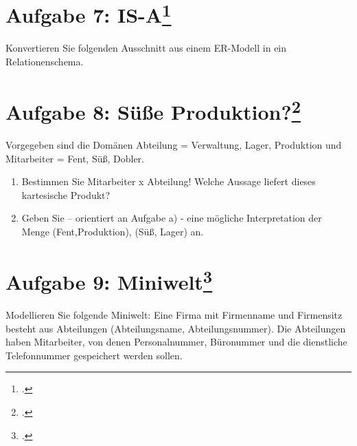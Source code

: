 \documentclass{lehramt-informatik}
\begin{document}
%

\section{Aufgabe 7: IS-A\footcite{db:ab:7}}

Konvertieren Sie folgenden Ausschnitt aus einem ER-Modell in ein Relationenschema.

%

\section{Aufgabe 8: Süße Produktion?\footcite{db:ab:7}}

Vorgegeben sind die Domänen Abteilung = Verwaltung, Lager, Produktion
und Mitarbeiter = Fent, Süß, Dobler.

\begin{enumerate}


\item Bestimmen Sie Mitarbeiter x Abteilung! Welche Aussage liefert
dieses kartesische Produkt?


\item Geben Sie – orientiert an Aufgabe a) - eine mögliche
Interpretation der Menge (Fent,Produktion), (Süß, Lager) an.

\end{enumerate}

%

\section{Aufgabe 9: Miniwelt\footcite{db:ab:7}}

Modellieren Sie folgende Miniwelt: Eine Firma mit Firmenname und
Firmensitz besteht aus Abteilungen (Abteilungsname, Abteilungsnummer).
Die Abteilungen haben Mitarbeiter, von denen Personalnummer, Büronummer
und die dienstliche Telefonnummer gespeichert werden sollen.

%
\end{document}

